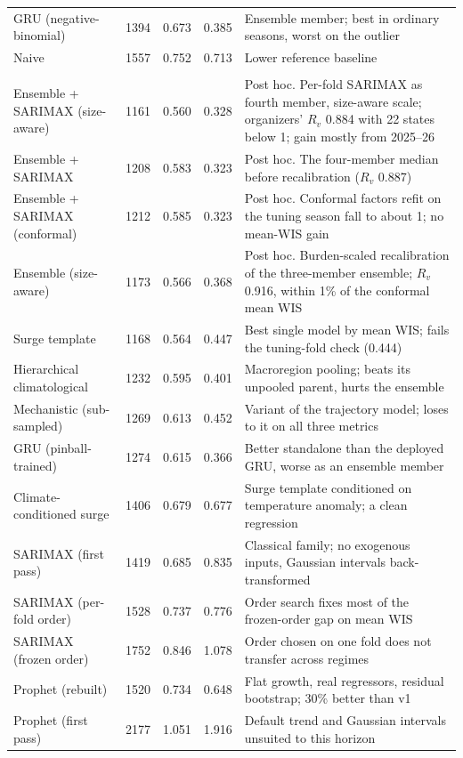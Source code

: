 \documentclass[11pt]{article}
\begin{document}
\begin{table}[p]
\begin{tabular}{@{}lrrrp{}@{}}
GRU (negative-binomial) & 1394 & 0.673 & 0.385 & Ensemble member; best in ordinary seasons, worst on the outlier \\
Naive & 1557 & 0.752 & 0.713 & Lower reference baseline \\
\addlinespace
\multicolumn{5}{@{}l}{\emph{Extended set (Section 2.8)}} \\
Ensemble + SARIMAX (size-aware) & 1161 & 0.560 & 0.328 & Post hoc. Per-fold SARIMAX as fourth member, size-aware scale; organizers' $R_v$ 0.884 with 22 states below 1; gain mostly from 2025--26 \\
Ensemble + SARIMAX & 1208 & 0.583 & 0.323 & Post hoc. The four-member median before recalibration ($R_v$ 0.887) \\
Ensemble + SARIMAX (conformal) & 1212 & 0.585 & 0.323 & Post hoc. Conformal factors refit on the tuning season fall to about 1; no mean-WIS gain \\
Ensemble (size-aware) & 1173 & 0.566 & 0.368 & Post hoc. Burden-scaled recalibration of the three-member ensemble; $R_v$ 0.916, within 1\% of the conformal mean WIS \\
Surge template & 1168 & 0.564 & 0.447 & Best single model by mean WIS; fails the tuning-fold check (0.444) \\
Hierarchical climatological & 1232 & 0.595 & 0.401 & Macroregion pooling; beats its unpooled parent, hurts the ensemble \\
Mechanistic (sub-sampled) & 1269 & 0.613 & 0.452 & Variant of the trajectory model; loses to it on all three metrics \\
GRU (pinball-trained) & 1274 & 0.615 & 0.366 & Better standalone than the deployed GRU, worse as an ensemble member \\
Climate-conditioned surge & 1406 & 0.679 & 0.677 & Surge template conditioned on temperature anomaly; a clean regression \\
SARIMAX (first pass) & 1419 & 0.685 & 0.835 & Classical family; no exogenous inputs, Gaussian intervals back-transformed \\
SARIMAX (per-fold order) & 1528 & 0.737 & 0.776 & Order search fixes most of the frozen-order gap on mean WIS \\
SARIMAX (frozen order) & 1752 & 0.846 & 1.078 & Order chosen on one fold does not transfer across regimes \\
Prophet (rebuilt) & 1520 & 0.734 & 0.648 & Flat growth, real regressors, residual bootstrap; 30\% better than v1 \\
Prophet (first pass) & 2177 & 1.051 & 1.916 & Default trend and Gaussian intervals unsuited to this horizon \\

\end{tabular}
\end{table}
\end{document}
